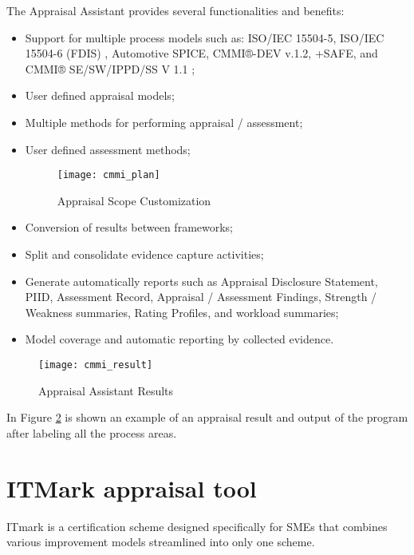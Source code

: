 The Appraisal Assistant provides several functionalities and benefits:
\begin{itemize}
	\item Support for multiple process models such as: ISO/IEC 15504-5, ISO/IEC 15504-6 (FDIS) \citep{rout2003iso}, Automotive SPICE, CMMI®-DEV v.1.2, +SAFE, and CMMI® SE/SW/IPPD/SS V 1.1 \citep{team2002capability};
	\item User defined appraisal models;
	\item Multiple methods for performing appraisal / assessment;
	\item User defined assessment methods;
	\begin{figure}[h]
		\begin{center}
			\leavevmode
			\texttt{[image: cmmi\_plan]}
			\caption{Appraisal Scope Customization}
			\label{fig:cmmi_plan}
		\end{center}
	\end{figure}
	\item Conversion of results between frameworks;
	\item Split and consolidate evidence capture activities;
	\item Generate automatically reports such as Appraisal Disclosure Statement, PIID, Assessment Record, Appraisal / Assessment Findings, Strength / Weakness summaries, Rating Profiles, and workload summaries;
	\item Model coverage and automatic reporting by collected evidence.
\end{itemize}


\begin{figure}[h]
	\begin{center}
		\leavevmode
		\texttt{[image: cmmi\_result]}
		\caption{Appraisal Assistant Results}
		\label{fig:cmmi_result}
	\end{center}
\end{figure}

In Figure \ref{fig:cmmi_result} is shown an example of an appraisal result and output of the program after labeling all the process areas.
\newpage


\section{ITMark appraisal tool}

ITmark \citep{ITMARK} is a certification scheme designed specifically for SMEs that combines various improvement models streamlined into only one scheme.

